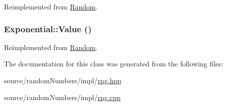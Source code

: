 Reimplemented from \hyperlink{classRandom_22b2951acd2008e8ff58fae434ab7ac5}{Random}.\hypertarget{classExponential_c2ad56e3dc3e65673cb54cab95d34a53}{
\subsubsection[{Value}]{ Exponential::Value ()}}
\label{classExponential_c2ad56e3dc3e65673cb54cab95d34a53}




Reimplemented from \hyperlink{classRandom_4d1c2876c5c78104186e241209d0e11e}{Random}.

The documentation for this class was generated from the following files:\begin{CompactItemize}
\item 
source/randomNumbers/impl/\hyperlink{rng_8hpp}{rng.hpp}\item 
source/randomNumbers/impl/\hyperlink{rng_8cpp}{rng.cpp}\end{CompactItemize}
